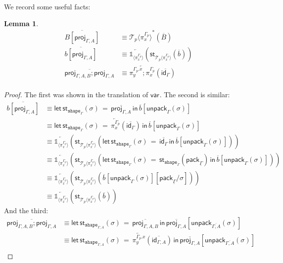 \documentclass[10pt]{article}
\newtheorem{lemma}{Lemma}
\theoremstyle{definition}
\newcommand{\id}{\mathsf{id}}
\newcommand{\rewrite}[2]{\overleftarrow{#1}(#2)}
\newcommand\St[2]{\ensuremath{{#1}^*(#2)}}
\newcommand\StI[2]{\ensuremath{\mathsf{st}_{#1}(#2)}}
\newcommand\StE[4]{\ensuremath{\mathsf{let} \, \StI{#1}{#3} \, = \, {#2} \, \mathsf{in} \, #4}}
\newcommand\ApEl[2]{\mathcal{T}_{#1}\langle#2\rangle}
\newcommand\pack[1]{\ensuremath{\mathsf{pack}_{#1}}}
\newcommand\unpack[2]{\ensuremath{\mathsf{unpack}_{#1}(#2)}}
\newcommand{\modeof}[1]{{#1}_p}
\newcommand{\tshape}[1]{\ensuremath{\mathtt{shape}_{#1}}}
\newcommand{\upstairs}[1]{\overline{#1}}
\newcommand{\downstairs}[1]{\underline{#1}}
\newcommand\proj[1]{\ensuremath{\mathsf{proj}_{#1}}}
\newcommand\qvar[1]{\ensuremath{\mathsf{var}_{#1}}}
\newcommand\One{\ensuremath{\mathds{1}}}
\newcommand\ApOne[1]{\ensuremath{\One_{\langle {#1} \rangle }}}
\begin{document}
We record some useful facts:
\begin{lemma}
\begin{align*}
\upstairs{B[\proj{\Gamma, A}]} &\equiv \St{\ApEl{p}{\pi^{\modeof{\Gamma}}_x}}{\upstairs{B}} \\
\upstairs{b[\proj{\Gamma, A}]} &\equiv \rewrite{\ApOne{\pi^{\modeof{\Gamma}}_x}}{\StI{\ApEl{p}{\pi^{\modeof{\Gamma}}_x}}{\upstairs{b}}} \\
\upstairs{\proj{\Gamma, A, B};\proj{\Gamma, A}} &\equiv \rewrite{\pi^{\modeof{\Gamma}.x}_y;\pi^{\modeof{\Gamma}}_x}{\upstairs{\id_{\Gamma}}} \\
\end{align*}
\end{lemma}
\begin{proof}
The first was shown in the translation of $\qvar{}$. The second is similar:
\begin{align*}
\upstairs{b[\proj{\Gamma, A}]}
&\equiv \StE{\tshape{\Gamma}}{\upstairs{\proj{\Gamma, A}}}{\sigma}{\upstairs{b}[\unpack{\Gamma}{\sigma}]} \\
&\equiv \StE{\tshape{\Gamma}}{\rewrite{\pi^{\modeof{\Gamma}}_x}{\upstairs{\id_\Gamma}}}{\sigma}{\upstairs{b}[\unpack{\Gamma}{\sigma}]} \\
&\equiv \rewrite{\ApOne{\pi^{\modeof{\Gamma}}_x}}{\StI{\ApEl{p}{\pi^{\modeof{\Gamma}}_x}}{\StE{\tshape{\Gamma}}{\upstairs{\id_\Gamma}}{\sigma}{\upstairs{b}[\unpack{\Gamma}{\sigma}]}}} \\
&\equiv \rewrite{\ApOne{\pi^{\modeof{\Gamma}}_x}}{\StI{\ApEl{p}{\pi^{\modeof{\Gamma}}_x}}{\StE{\tshape{\Gamma}}{\StI{\tshape{\Gamma}}{\pack{\downstairs{\Gamma}}}}{\sigma}{\upstairs{b}[\unpack{\Gamma}{\sigma}]}}} \\
&\equiv \rewrite{\ApOne{\pi^{\modeof{\Gamma}}_x}}{\StI{\ApEl{p}{\pi^{\modeof{\Gamma}}_x}}{\upstairs{b}[\unpack{\Gamma}{\sigma}][\pack{\downstairs{\Gamma}}/\sigma]}} \\
&\equiv \rewrite{\ApOne{\pi^{\modeof{\Gamma}}_x}}{\StI{\ApEl{p}{\pi^{\modeof{\Gamma}}_x}}{\upstairs{b}}}
\end{align*}
And the third:
\begin{align*}
\upstairs{\proj{\Gamma, A, B};\proj{\Gamma, A}} 
&\equiv \StE{\tshape{\Gamma, A}}{\upstairs{\proj{\Gamma, A, B}}}{\sigma}{\upstairs{\proj{\Gamma, A}}[\unpack{\upstairs{\Gamma, A}}{\sigma}]} \\
&\equiv \StE{\tshape{\Gamma, A}}{\rewrite{\pi^{\modeof{\Gamma}.x}_y}{\upstairs{\id_{\Gamma, A}}}}{\sigma}{\upstairs{\proj{\Gamma, A}}[\unpack{\upstairs{\Gamma, A}}{\sigma}]} \\

\end{align*}
\end{proof}
\end{document}

